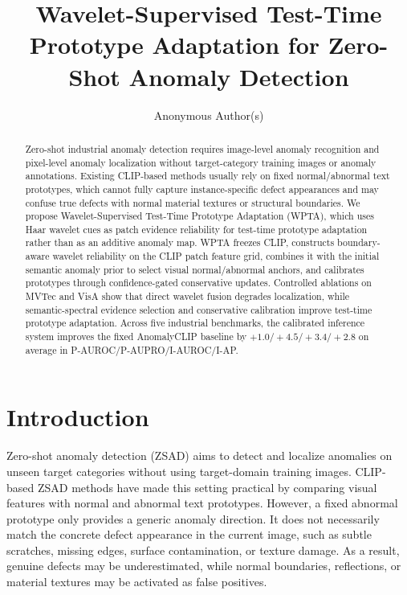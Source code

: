\documentclass[runningheads]{llncs}
\title{Wavelet-Supervised Test-Time Prototype Adaptation for Zero-Shot Anomaly Detection}
\author{Anonymous Author(s)}
\institute{Anonymous Institution}
\begin{document}
\maketitle

\begin{abstract}
Zero-shot industrial anomaly detection requires image-level anomaly recognition and pixel-level anomaly localization without target-category training images or anomaly annotations. Existing CLIP-based methods usually rely on fixed normal/abnormal text prototypes, which cannot fully capture instance-specific defect appearances and may confuse true defects with normal material textures or structural boundaries. We propose Wavelet-Supervised Test-Time Prototype Adaptation (WPTA), which uses Haar wavelet cues as patch evidence reliability for test-time prototype adaptation rather than as an additive anomaly map. WPTA freezes CLIP, constructs boundary-aware wavelet reliability on the CLIP patch feature grid, combines it with the initial semantic anomaly prior to select visual normal/abnormal anchors, and calibrates prototypes through confidence-gated conservative updates. Controlled ablations on MVTec and VisA show that direct wavelet fusion degrades localization, while semantic-spectral evidence selection and conservative calibration improve test-time prototype adaptation. Across five industrial benchmarks, the calibrated inference system improves the fixed AnomalyCLIP baseline by $+1.0/+4.5/+3.4/+2.8$ on average in P-AUROC/P-AUPRO/I-AUROC/I-AP.
\end{abstract}

\section{Introduction}

Zero-shot anomaly detection (ZSAD) aims to detect and localize anomalies on unseen target categories without using target-domain training images. CLIP-based ZSAD methods have made this setting practical by comparing visual features with normal and abnormal text prototypes. However, a fixed abnormal prototype only provides a generic anomaly direction. It does not necessarily match the concrete defect appearance in the current image, such as subtle scratches, missing edges, surface contamination, or texture damage. As a result, genuine defects may be underestimated, while normal boundaries, reflections, or material textures may be activated as false positives.
\end{document}
